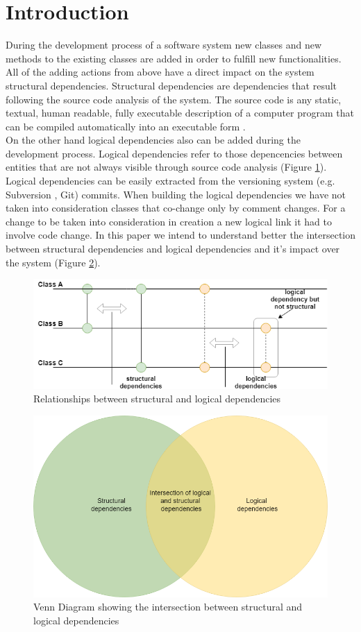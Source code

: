\documentclass[conference,compsoc]{IEEEtran}
\begin{document}
\section{Introduction}
During the development process of a software system new classes and new methods to the existing classes are added in order to fulfill new functionalities. All of the adding actions from above have a direct impact on the system structural dependencies. Structural dependencies are dependencies that result following the source code analysis of the system. The source code is any static, textual, human readable, fully executable description of a computer program that can be compiled automatically into an executable form\cite{ct1} .\\ On the other hand logical dependencies also can be added during the development process. Logical dependencies refer to those depencencies between entities that are not always visible through source code analysis (Figure \ref{fig:fig1}). \\Logical dependencies can be easily extracted from the versioning system (e.g. Subversion , Git) commits. When building the logical dependencies we have not taken into consideration classes that co-change only by comment changes. For a change to be taken into consideration in creation a new logical link it had to involve code change.  In this paper we intend to understand better the intersection between structural dependencies and logical dependencies and it's impact over the system (Figure \ref{fig:fig2}). 
\begin{figure}
\includegraphics[scale=0.45]{fig1.png}
\caption{Relationships between structural and logical dependencies }
\label{fig:fig1}
\end{figure}
\begin{figure}
\includegraphics[scale=0.35]{fig2.png}
\caption{Venn Diagram showing the intersection between structural and logical dependencies }
\label{fig:fig2}
\end{figure}
\end{document}
